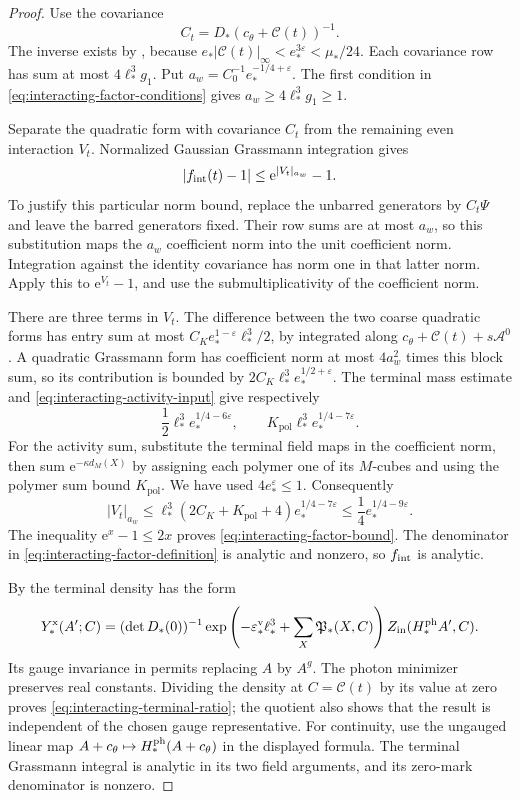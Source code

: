 \begin{proof}
Use the covariance
\[
 C_t=D_*(c_\theta+\mathscr C(t))^{-1}.
\]
The inverse exists by
\cite[(75)]{TerminalPressure}, because
$e_*|\mathscr C(t)|_\infty<e_*^{3\varepsilon}
<\mu_*/24$. Each covariance row has sum at
most $4\ell_*^3g_1$. Put
$a_w=C_0^{-1}e_*^{-1/4+\varepsilon}$.
The first condition in
\eqref{eq:interacting-factor-conditions} gives
$a_w\ge4\ell_*^3g_1\ge1$.

Separate the quadratic form with covariance $C_t$
from the remaining even interaction $V_t$.
Normalized Gaussian Grassmann integration gives
\begin{equation}\label{eq:interacting-crude-Gaussian}
 |f_{\rm int}(t)-1|\le \mathrm e^{|V_t|_{a_w}}-1.
\end{equation}
To justify this particular norm bound, replace
the unbarred generators by $C_t\Psi$ and leave
the barred generators fixed. Their row sums
are at most $a_w$, so this substitution maps
the $a_w$ coefficient norm into the unit
coefficient norm. Integration against the identity
covariance has norm one in that latter norm.
Apply this to $\mathrm e^{V_t}-1$, and use the
submultiplicativity of the coefficient norm.

There are three terms in $V_t$. The difference
between the two coarse quadratic forms has
entry sum at most
$C_Ke_*^{1-\varepsilon}\ell_*^3/2$, by
\cite[(66)]{TerminalPressure} integrated along
$c_\theta+\mathscr C(t)+s\mathscr A^0$.
A quadratic Grassmann form has coefficient norm
at most $4a_w^2$ times this block sum, so
its contribution is bounded by
$2C_K\ell_*^3e_*^{1/2+\varepsilon}$.
The terminal mass estimate and
\eqref{eq:interacting-activity-input} give respectively
\[
 \frac12\ell_*^3e_*^{1/4-6\varepsilon},
 \qquad K_{\mathrm{pol}}\ell_*^3e_*^{1/4-7\varepsilon}.
\]
For the activity sum, substitute the terminal
field maps in the coefficient norm, then sum
$\mathrm e^{-\kappa d_M(X)}$ by assigning each polymer
one of its $M$-cubes and using the polymer
sum bound $K_{\mathrm{pol}}$. We have used
$4e_*^\varepsilon\le1$.
Consequently
\[
 |V_t|_{a_w}\le
 \ell_*^3(2C_K+K_{\mathrm{pol}}+4)e_*^{1/4-7\varepsilon}
 \le\frac14e_*^{1/4-9\varepsilon}.
\]
The inequality $\mathrm e^x-1\le2x$ proves
\eqref{eq:interacting-factor-bound}.
The denominator in \eqref{eq:interacting-factor-definition}
is analytic and nonzero, so $f_{\rm int}$ is analytic.

By \cite[(16)]{TerminalPressure} the terminal density has the form
\[
 Y_*^{\rm x}(A';C)=
 (\det D_*(0))^{-1}
 \exp\left(-\varepsilon_*^{\rm v}\ell_*^3+
                         \sum_X\mathfrak P_*(X,C)\right)
 Z_{\rm in}(H_*^{\rm ph}A',C).
\]
Its gauge invariance in \cite[Theorem~B]{TerminalPressure}
permits replacing $A$ by
$A^g$. The photon minimizer preserves real
constants. Dividing the density at $C=\mathscr C(t)$
by its value at zero proves
\eqref{eq:interacting-terminal-ratio}; the quotient
also shows that the result is independent of
the chosen gauge representative. For continuity,
use the ungauged linear map
$A+c_\theta\mapsto H_*^{\rm ph}(A+c_\theta)$
in the displayed formula. The terminal Grassmann
integral is analytic in its two field arguments,
and its zero-mark denominator is nonzero.


\end{proof}
